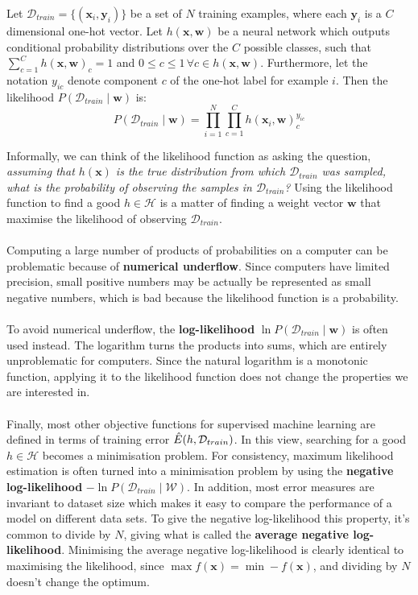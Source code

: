 \begin{definition}
	\label{likelihood}
	Let $\mathcal{D}_{train} = \{(\mathbf{x}_i, \mathbf{y}_i)\}$ be a set of $N$ training examples, where each $\mathbf{y}_i$ is a $C$ dimensional one-hot vector. Let $h(\mathbf{x}, \mathbf{w})$ be a neural network which outputs conditional probability distributions over the $C$ possible classes, such that $\sum_{c=1}^C h(\mathbf{x}, \mathbf{w})_c = 1$ and $0 \leq c \leq 1 \,\forall c \in h(\mathbf{x}, \mathbf{w})$. Furthermore, let the notation $y_{ic}$ denote component $c$ of the one-hot label for example $i$. Then the likelihood $P(\mathcal{D}_{train} \mid \mathbf{w})$ is:
	$$
	P(\mathcal{D}_{train} \mid \mathbf{w}) = \prod\limits_{i=1}^N\prod\limits_{c=1}^C h(\mathbf{x}_i, \mathbf{w})_c^{y_{ic}}
	$$
\end{definition}
\noindent
Informally, we can think of the likelihood function as asking the question, \textit{assuming that $h(\mathbf{x})$ is the true distribution from which $\mathcal{D}_{train}$ was sampled, what is the probability of observing the samples in $\mathcal{D}_{train}$?} Using the likelihood function to find a good $h \in \mathcal{H}$ is a matter of finding a weight vector $\mathbf{w}$ that maximise the likelihood of observing $\mathcal{D}_{train}$.
\\\\ 
Computing a large number of products of probabilities on a computer can be problematic because of \textbf{numerical underflow}. Since computers have limited precision, small positive numbers may be actually be represented as small negative numbers, which is bad because the likelihood function is a probability.
\\\\
To avoid numerical underflow, the \textbf{log-likelihood} $\ln P(\mathcal{D}_{train} \mid \mathbf{w})$ is often used instead. The logarithm turns the products into sums, which are entirely unproblematic for computers. Since the natural logarithm is a monotonic function, applying it to the likelihood function does not change the properties we are interested in.
\\\\
Finally, most other objective functions for supervised machine learning are defined in terms of training error $\hat{E}(h, \mathcal{D}_{train})$. In this view, searching for a good $h \in \mathcal{H}$ becomes a minimisation problem. For consistency, maximum likelihood estimation is often turned into a minimisation problem by using the \textbf{negative log-likelihood} $-\ln P(\mathcal{D}_{train} \mid \mathcal{W})$. In addition, most error measures are invariant to dataset size which makes it easy to compare the performance of a model on different data sets. To give the negative log-likelihood this property, it's common to divide by $N$, giving what is called the \textbf{average negative log-likelihood}. Minimising the average negative log-likelihood is clearly identical to maximising the likelihood, since $\max f(\mathbf{x}) = \min -f(\mathbf{x})$, and dividing by $N$ doesn't change the optimum.

